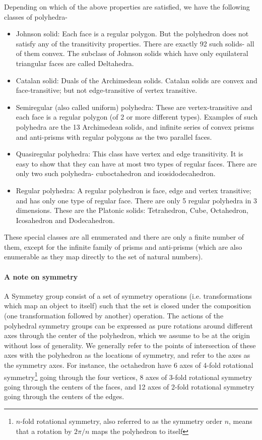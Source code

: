 \documentclass[11pt]{article}
\newcommand{\1}{\mathds{1}}
\begin{document}
Depending on which of the above properties are satisfied, we have the following classes of polyhedra-
\begin{itemize}
 \item Johnson solid: Each face is a regular polygon. But the polyhedron does not satisfy any of the transitivity properties. There are exactly 92 such solids- all of them convex. The subclass of Johnson solids which have only equilateral triangular faces are called Deltahedra.
 \item Catalan solid: Duals of the Archimedean solids. Catalan solids are convex and face-transitive; but not edge-transitive of vertex transitive.
 \item Semiregular (also called uniform) polyhedra: These are vertex-transitive and each face is a regular polygon (of 2 or more different types). Examples of such polyhedra are the 13 Archimedean solids, and infinite series of convex prisms and anti-prisms with regular polygons as the two parallel faces.
 \item Quasiregular polyhedra: This class have vertex and edge transitivity. It is easy to show that they can have at most two types of regular faces. There are only two such polyhedra- cuboctahedron and icosidodecahedron.
 \item Regular polyhedra: A regular polyhedron is face, edge and vertex transitive; and has only one type of regular face. There are only 5 regular polyhedra in 3 dimensions. These are the Platonic solids: Tetrahedron, Cube, Octahedron, Icosahedron and Dodecahedron.
\end{itemize}

These special classes are all enumerated and there are only a finite number of them, except for the infinite family of prisms and anti-prisms (which are also enumerable as they map directly to the set of natural numbers). 

\paragraph{A note on symmetry}
A Symmetry group consist of a set of symmetry operations (i.e. transformations which map an object to itself) such that the set is closed under the composition (one transformation followed by another) operation. The actions of the polyhedral symmetry groups can be expressed as pure rotations around different axes through the center of the polyhedron, which we assume to be at the origin without loss of generality. We generally refer to the points of intersection of these axes with the polyhedron as the locations of symmetry, and refer to the axes as the symmetry axes. For instance, the octahedron have 6 axes of 4-fold rotational symmetry\footnote{$n$-fold rotational symmetry, also referred to as the symmetry order $n$, means that a rotation by $2\pi/n$ maps the polyhedron to itself} going through the four vertices, 8 axes of 3-fold rotational symmetry going through the centers of the faces, and 12 axes of 2-fold rotational symmetry going through the centers of the edges. 
\end{document}
